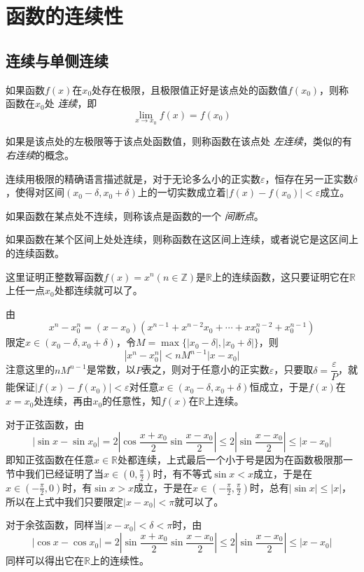 
\section{函数的连续性}
\label{sec:continuousness-of-function}

\subsection{连续与单侧连续}
\label{sec:continuousness-and-single-continuousness}

\begin{definition}
  如果函数$f(x)$在$x_0$处存在极限，且极限值正好是该点处的函数值$f(x_0)$，则称函数在$x_0$处 \emph{连续}，即
  \[ \lim_{x \to x_0} f(x) = f(x_0) \]
\end{definition}

如果是该点处的左极限等于该点处函数值，则称函数在该点处 \emph{左连续}，类似的有 \emph{右连续}的概念。

连续用极限的精确语言描述就是，对于无论多么小的正实数$\varepsilon$，恒存在另一正实数$\delta$，使得对区间$(x_0-\delta, x_0+\delta)$上的一切实数成立着$|f(x)-f(x_0)|<\varepsilon$成立。

如果函数在某点处不连续，则称该点是函数的一个 \emph{间断点}。

\begin{definition}
  如果函数在某个区间上处处连续，则称函数在这区间上连续，或者说它是这区间上的连续函数。
\end{definition}

\begin{example}
  \label{example:continous-of-x-power-integer}
  这里证明正整数幂函数$f(x)=x^n(n \in \mathbb{Z})$是$\mathbb{R}$上的连续函数，这只要证明它在$\mathbb{R}$上任一点$x_0$处都连续就可以了。

  由
  \[ x^n-x_0^n = (x-x_0)(x^{n-1}+x^{n-2}x_0+\cdots+xx_0^{n-2}+x_0^{n-1}) \]
  限定$x \in (x_0-\delta,x_0+\delta)$，令$M=\max\{|x_0-\delta|,|x_0+\delta|\}$，则
  \[ |x^n-x_0^n| < nM^{n-1}|x-x_0| \]
  注意这里的$nM^{n-1}$是常数，以$P$表之，则对于任意小的正实数$\varepsilon$，只要取$\delta=\dfrac{\varepsilon}{P}$，就能保证$|f(x)-f(x_0)|<\varepsilon$对任意$x \in (x_0-\delta,x_0+\delta)$恒成立，于是$f(x)$在$x=x_0$处连续，再由$x_0$的任意性，知$f(x)$在$\mathbb{R}$上连续。
\end{example}

\begin{example}
  对于正弦函数，由
  \[ |\sin{x}-\sin{x_0}| = 2 \left|\cos{\frac{x+x_0}{2}}\sin{\frac{x-x_0}{2}}\right| \leqslant 2 \left| \sin{\frac{x-x_0}{2}} \right| \leqslant |x-x_0| \]
  即知正弦函数在任意$x \in \mathbb{R}$处都连续，上式最后一个小于号是因为在函数极限那一节中我们已经证明了当$x \in (0,\frac{\pi}{2})$时，有不等式$\sin{x}<x$成立，于是在$x \in (-\frac{\pi}{2}, 0)$时，有$\sin{x}>x$成立，于是在$x \in (-\frac{\pi}{2}, \frac{\pi}{2})$时，总有$|\sin{x}| \leqslant |x|$，所以在上式中我们只要限定$|x-x_0| < \pi$就可以了。

  对于余弦函数，同样当$|x-x_0|<\delta<\pi$时，由
  \[ |\cos{x}-\cos{x_0}| = 2 \left| \sin{\frac{x+x_0}{2}}\sin{\frac{x-x_0}{2}} \right| \leqslant 2 \left| \sin{\frac{x-x_0}{2}} \right| \leqslant |x-x_0| \]
  同样可以得出它在$\mathbb{R}$上的连续性。
\end{example}

